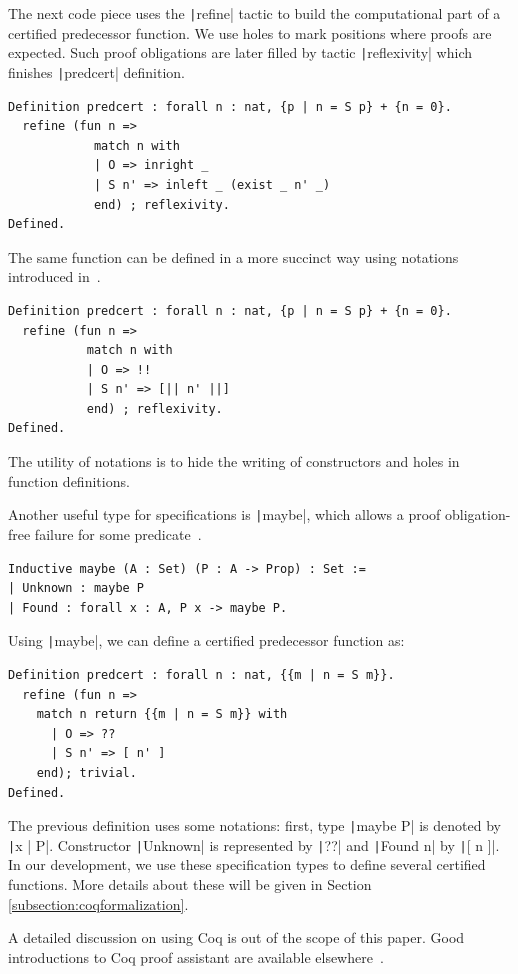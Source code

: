 \documentclass[oneside,12pt]{scrbook}
\theoremstyle{definition}
\newcommand{\coq}[1]{\texttt|#1|}
\theoremstyle{plain}
\theoremstyle{definition}
\begin{document}
The next code piece uses the \coq{refine} tactic to build the computational part
of a certified predecessor function. We use holes to mark positions where proofs are
expected. Such proof obligations are later filled by tactic \coq{reflexivity} which finishes
\coq{predcert} definition.

\begin{verbatim}
Definition predcert : forall n : nat, {p | n = S p} + {n = 0}.
  refine (fun n =>
            match n with
            | O => inright _
            | S n' => inleft _ (exist _ n' _)
            end) ; reflexivity.
Defined.
\end{verbatim}

The same function can be defined in a more succinct way using notations introduced
in~\cite{Chlipala13}.

\begin{verbatim}
Definition predcert : forall n : nat, {p | n = S p} + {n = 0}.
  refine (fun n =>
           match n with
           | O => !!
           | S n' => [|| n' ||]
           end) ; reflexivity.
Defined.
\end{verbatim}
The utility of notations is to hide the writing of constructors and holes in
function definitions.

Another useful type for specifications is \coq{maybe}, which allows a proof
obligation-free failure for some predicate~\cite{Chlipala13}.
\begin{verbatim}
Inductive maybe (A : Set) (P : A -> Prop) : Set :=
| Unknown : maybe P
| Found : forall x : A, P x -> maybe P.
\end{verbatim}
Using \coq{maybe}, we can define a certified predecessor function as:
\begin{verbatim}
Definition predcert : forall n : nat, {{m | n = S m}}.
  refine (fun n =>
    match n return {{m | n = S m}} with
      | O => ??
      | S n' => [ n' ]
    end); trivial.
Defined.
\end{verbatim}
The previous definition uses some notations: first, type \coq{maybe P} is
denoted by \coq{{{x | P}}}. Constructor \coq{Unknown} is represented by \coq{??}
and \coq{Found n} by \coq{[ n ]}. In our development, we use these
specification types to define several certified functions. More details about
these will be given in Section \ref{subsection:coqformalization}.

A detailed discussion on using Coq is out of the scope of this paper. Good introductions
to Coq proof assistant are available elsewhere~\cite{Bertot2010,Chlipala13}.
\end{document}
